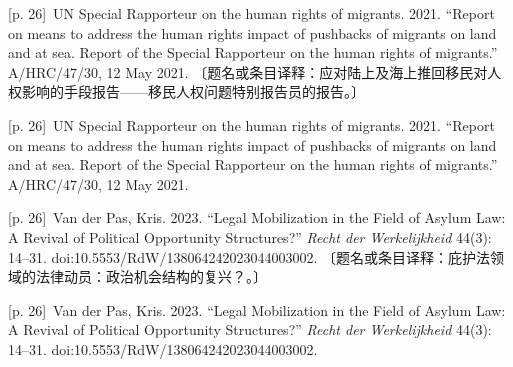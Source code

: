 \documentclass[10pt,a4paper]{article}
\begin{document}
\noindent\begin{minipage}{\textwidth}\begin{minipage}[t]{\dimexpr.5\textwidth-4mm\relax}{\scriptsize\color{gray} [p. 26]}\ UN Special Rapporteur on the human rights of migrants. 2021. “Report on means to address the human rights impact of pushbacks of migrants on land and at sea. Report of the Special Rapporteur on the human rights of migrants.” A/HRC/47/30, 12 May 2021. 〔题名或条目译释：应对陆上及海上推回移民对人权影响的手段报告——移民人权问题特别报告员的报告。〕\par\end{minipage}\hfill\begin{minipage}[t]{\dimexpr.5\textwidth-4mm\relax}{\scriptsize\color{gray} [p. 26]}\ UN Special Rapporteur on the human rights of migrants. 2021. “Report on means to address the human rights impact of pushbacks of migrants on land and at sea. Report of the Special Rapporteur on the human rights of migrants.” A/HRC/47/30, 12 May 2021.\par\end{minipage}\end{minipage}\par
\noindent\begin{minipage}{\textwidth}\begin{minipage}[t]{\dimexpr.5\textwidth-4mm\relax}{\scriptsize\color{gray} [p. 26]}\ Van der Pas, Kris. 2023. “Legal Mobilization in the Field of Asylum Law: A Revival of Political Opportunity Structures?” \textit{Recht der Werkelijkheid} 44(3): 14–31. doi:10.5553/RdW/138064242023044003002. 〔题名或条目译释：庇护法领域的法律动员：政治机会结构的复兴？。〕\par\end{minipage}\hfill\begin{minipage}[t]{\dimexpr.5\textwidth-4mm\relax}{\scriptsize\color{gray} [p. 26]}\ Van der Pas, Kris. 2023. “Legal Mobilization in the Field of Asylum Law: A Revival of Political Opportunity Structures?” \textit{Recht der Werkelijkheid} 44(3): 14–31. doi:10.5553/RdW/138064242023044003002.\par\end{minipage}\end{minipage}\par
\end{document}
